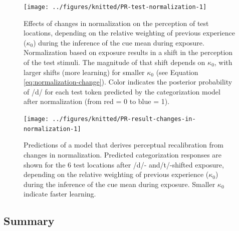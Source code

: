 \documentclass[
  11pt,
  man,floatsintext]{apa6}
\begin{document}
\begin{figure}

{\centering \texttt{[image: ../figures/knitted/PR-test-normalization-1]} 

}

\caption{Effects of changes in normalization on the perception of test locations, depending on the relative weighting of previous experience (\(\kappa_0\)) during the inference of the cue mean during exposure. Normalization based on exposure results in a shift in the perception of the test stimuli. The magnitude of that shift depends on \(\kappa_0\), with larger shifts (more learning) for smaller \(\kappa_0\) (see Equation \eqref{eq:normalization-change}). Color indicates the posterior probability of /d/ for each test token predicted by the categorization model after normalization (from red = 0 to blue = 1).}\label{fig:PR-test-normalization}
\end{figure}



\begin{figure}

{\centering \texttt{[image: ../figures/knitted/PR-result-changes-in-normalization-1]} 

}

\caption{Predictions of a model that derives perceptual recalibration from changes in normalization. Predicted categorization responses are shown for the 6 test locations after /d/- and/t/-shifted exposure, depending on the relative weighting of previous experience (\(\kappa_0\)) during the inference of the cue mean during exposure. Smaller \(\kappa_0\) indicate faster learning.}\label{fig:PR-result-changes-in-normalization}
\end{figure}

\hypertarget{summary}{%
\subsection{Summary}\label{summary}}
\end{document}
